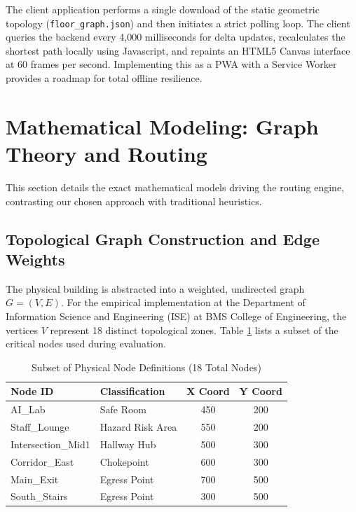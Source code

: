 \documentclass[conference]{IEEEtran}
\begin{document}
The client application performs a single download of the static geometric topology
(\texttt{floor\_graph.json}) and then initiates a strict polling loop. The client queries the
backend every 4,000 milliseconds for delta updates, recalculates the shortest path locally using
Javascript, and repaints an HTML5 Canvas interface at 60 frames per second. Implementing this as a
PWA with a Service Worker provides a roadmap for total offline resilience.

\section{Mathematical Modeling: Graph Theory and Routing}

This section details the exact mathematical models driving the routing engine, contrasting our
chosen approach with traditional heuristics.

\subsection{Topological Graph Construction and Edge Weights}
The physical building is abstracted into a weighted, undirected graph $G = (V, E)$. For the
empirical implementation at the Department of Information Science and Engineering (ISE) at BMS
College of Engineering, the vertices $V$ represent 18 distinct topological zones. Table
\ref{tab:nodes} lists a subset of the critical nodes used during evaluation.

\begin{table}[htbp]
\centering
\caption{Subset of Physical Node Definitions (18 Total Nodes)}
\label{tab:nodes}
\begin{tabular}{@{}llcc@{}}
\toprule
\textbf{Node ID} & \textbf{Classification} & \textbf{X Coord} & \textbf{Y Coord} \\ \midrule
AI\_Lab & Safe Room & 450 & 200 \\
Staff\_Lounge & Hazard Risk Area & 550 & 200 \\
Intersection\_Mid1 & Hallway Hub & 500 & 300 \\
Corridor\_East & Chokepoint & 600 & 300 \\
Main\_Exit & Egress Point & 700 & 500 \\
South\_Stairs & Egress Point & 300 & 500 \\ \bottomrule
\end{tabular}
\end{table}
\end{document}
